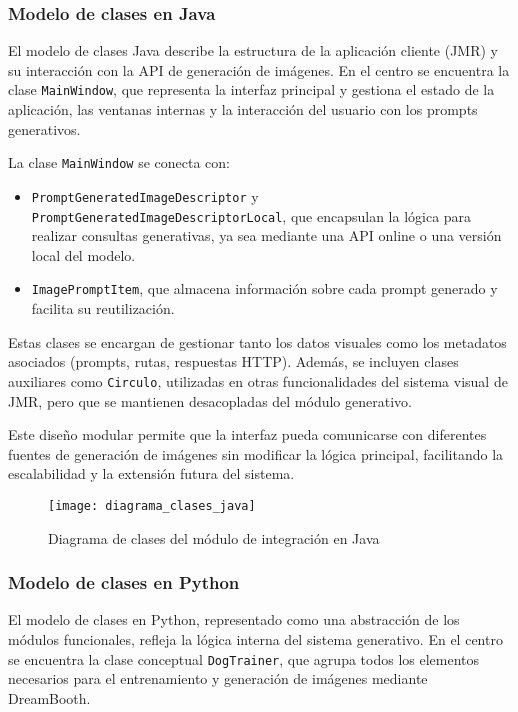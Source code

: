 \subsubsection{Modelo de clases en Java}

El modelo de clases Java describe la estructura de la aplicación cliente (JMR) y su interacción con la API de generación de imágenes. En el centro se encuentra la clase \texttt{MainWindow}, que representa la interfaz principal y gestiona el estado de la aplicación, las ventanas internas y la interacción del usuario con los prompts generativos.

La clase \texttt{MainWindow} se conecta con:
\begin{itemize}
\item \texttt{PromptGeneratedImageDescriptor} y \texttt{PromptGeneratedImageDescriptorLocal}, que encapsulan la lógica para realizar consultas generativas, ya sea mediante una API online o una versión local del modelo.
\item \texttt{ImagePromptItem}, que almacena información sobre cada prompt generado y facilita su reutilización.
\end{itemize}

Estas clases se encargan de gestionar tanto los datos visuales como los metadatos asociados (prompts, rutas, respuestas HTTP). Además, se incluyen clases auxiliares como \texttt{Circulo}, utilizadas en otras funcionalidades del sistema visual de JMR, pero que se mantienen desacopladas del módulo generativo.

Este diseño modular permite que la interfaz pueda comunicarse con diferentes fuentes de generación de imágenes sin modificar la lógica principal, facilitando la escalabilidad y la extensión futura del sistema.

\begin{figure}[H]
\centering
\texttt{[image: diagrama\_clases\_java]}
\caption{Diagrama de clases del módulo de integración en Java}
\label{fig:clases-java}
\end{figure}

\subsubsection{Modelo de clases en Python}

El modelo de clases en Python, representado como una abstracción de los módulos funcionales, refleja la lógica interna del sistema generativo. En el centro se encuentra la clase conceptual \texttt{DogTrainer}, que agrupa todos los elementos necesarios para el entrenamiento y generación de imágenes mediante DreamBooth.

